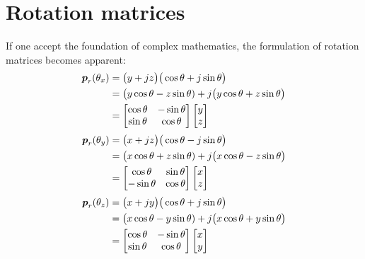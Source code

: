 
\newpage 

\section{Rotation matrices}

If one accept the foundation of complex mathematics, the formulation of rotation matrices becomes apparent:
%
\begin{align}
\boldsymbol{p}_r(\theta_x)
&= \big(y +jz\big) \big( \cos\theta + j\sin\theta \big) \nonumber\\
&= \big(y\cos\theta - z\sin\theta ) +j\big( y\cos\theta + z\sin\theta \big) \nonumber\\
&= \begin{bmatrix} \cos\theta & -\sin\theta \\ \sin\theta & \cos\theta \end{bmatrix}\begin{bmatrix}y \\ z\end{bmatrix}
\end{align}
%
\begin{align}
\boldsymbol{p}_r(\theta_y)
&= \big(x +jz\big) \big( \cos\theta - j\sin\theta \big) \nonumber\\
&= \big(x\cos\theta + z\sin\theta ) +j\big( x\cos\theta - z\sin\theta \big) \nonumber\\
&= \begin{bmatrix} \cos\theta & \sin\theta \\ -\sin\theta & \cos\theta \end{bmatrix}\begin{bmatrix}x \\ z\end{bmatrix}
\end{align}
%
\begin{align}
\boldsymbol{p}_r(\theta_z)
&= \big(x +jy\big) \big( \cos\theta + j\sin\theta \big) \nonumber\\
&= \big(x\cos\theta - y\sin\theta ) +j\big( x\cos\theta + y\sin\theta \big) \nonumber\\
&= \begin{bmatrix} \cos\theta & -\sin\theta \\ \sin\theta & \cos\theta \end{bmatrix}\begin{bmatrix}x \\ y\end{bmatrix}
\end{align}